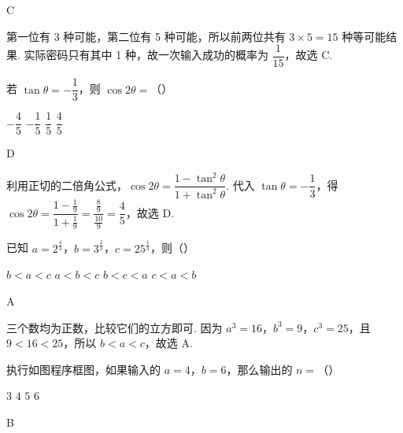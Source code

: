 \begin{answer}
C
\end{answer}

\begin{solution}
第一位有 3 种可能，第二位有 5 种可能，所以前两位共有 \(3\times5=15\) 种等可能结果. 实际密码只有其中 1 种，故一次输入成功的概率为 \(\dfrac1{15}\)，故选 C.
\end{solution}

\begin{problem}
若 \(\tan\theta=-\dfrac13\)，则 \(\cos2\theta=\)（\quad）

\choices
    {\(-\dfrac45\)}
    {\(-\dfrac15\)}
    {\(\dfrac15\)}
    {\(\dfrac45\)}
\end{problem}

\begin{answer}
D
\end{answer}

\begin{solution}
利用正切的二倍角公式，\(\cos2\theta=\dfrac{1-\tan^2\theta}{1+\tan^2\theta}\). 代入 \(\tan\theta=-\dfrac13\)，得 \(\cos2\theta=\dfrac{1-\frac19}{1+\frac19}=\dfrac{\frac{8}{9}}{\frac{10}{9}}=\dfrac45\)，故选 D.
\end{solution}

\begin{problem}
已知 \(a=2^{\frac43}\)，\(b=3^{\frac23}\)，\(c=25^{\frac13}\)，则（\quad）

\choices
    {\(b<a<c\)}
    {\(a<b<c\)}
    {\(b<c<a\)}
    {\(c<a<b\)}
\end{problem}

\begin{answer}
A
\end{answer}

\begin{solution}
三个数均为正数，比较它们的立方即可. 因为 \(a^3=16\)，\(b^3=9\)，\(c^3=25\)，且 \(9<16<25\)，所以 \(b<a<c\)，故选 A.
\end{solution}

\begin{problem}
执行如图程序框图，如果输入的 \(a=4\)，\(b=6\)，那么输出的 \(n=\)（\quad）

\begingroup
{}
\endgroup

\choices
    {\(3\)}
    {\(4\)}
    {\(5\)}
    {\(6\)}
\end{problem}

\begin{answer}
B
\end{answer}

